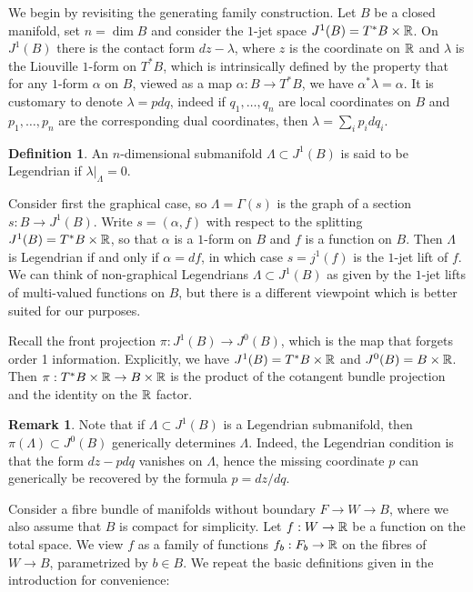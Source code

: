 \documentclass[11pt]{article}
\numberwithin{equation}{section}\providecommand{\dpl}{\displaystyle}
\theoremstyle{plain}
\theoremstyle{definition}
\newtheorem{definition}[theorem]{Definition}
\newtheorem{remark}[theorem]{Remark}
\begin{document}
We begin by revisiting the generating family construction. Let $B$ be a closed manifold, set $n=\dim B$ and consider the $1$-jet space $J^1(B)=T^*B \times \mathbb{R}$. On $J^1(B)$ there is the contact form $dz-\lambda$, where $z$ is the coordinate on $\mathbb{R}$ and $\lambda$ is the Liouville $1$-form on $T^*B$, which is intrinsically defined by the property that for any $1$-form $\alpha$ on $B$, viewed as a map $\alpha: B \to T^*B$, we have $\alpha^*\lambda=\alpha$. It is customary to denote $\lambda=pdq$, indeed if $q_1,\ldots, q_n$ are local coordinates on $B$ and $p_1,\ldots,p_n$ are the corresponding dual coordinates, then $\lambda=\sum_i p_i dq_i$.

\begin{definition} An $n$-dimensional submanifold $\Lambda \subset J^1(B)$ is said to be Legendrian if $\lambda |_\Lambda=0$.
\end{definition}

Consider first the graphical case, so $\Lambda=\Gamma(s)$ is the graph of a section $s:B \to J^1(B)$. Write $s=(\alpha,f)$ with respect to the splitting $J^1(B)=T^*B \times \mathbb{R}$, so that $\alpha$ is a $1$-form on $B$ and $f$ is a function on $B$. Then $\Lambda$ is Legendrian if and only if $\alpha=df$, in which case $s=j^1(f)$ is the $1$-jet lift of $f$. We can think of non-graphical Legendrians $\Lambda \subset J^1(B)$ as given by the $1$-jet lifts of multi-valued functions on $B$, but there is a different viewpoint which is better suited for our purposes.

Recall the front projection $\pi:J^1(B) \to J^0(B)$, which is the map that forgets order 1 information. Explicitly, we have $J^1(B)=T^*B \times \mathbb{R}$ and $J^0(B)=B \times \mathbb{R}$. Then $\pi : T^*B \times \mathbb{R} \to B \times \mathbb{R}$ is the product of the cotangent bundle projection and the identity on the $\mathbb{R}$ factor.

\begin{remark} Note that if $\Lambda \subset J^1(B)$ is a Legendrian submanifold, then $\pi(\Lambda) \subset J^0(B)$ generically determines $\Lambda$. Indeed, the Legendrian condition is that the form $dz-pdq$ vanishes on $\Lambda$, hence the missing coordinate $p$ can generically be recovered by the formula $p=dz/dq$.
\end{remark}

Consider a fibre bundle of manifolds without boundary $F \to W \to B$, where we also assume that $B$ is compact for simplicity. Let $f:W \to \mathbb{R}$ be a function on the total space. We view $f$ as a family of functions $f_b:F_b \to \mathbb{R}$ on the fibres of $W \to B$, parametrized by $b \in B$. We repeat the basic definitions given in the introduction for convenience:
\end{document}
